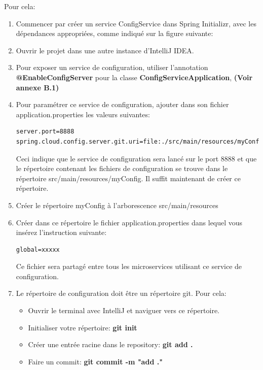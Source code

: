     Pour cela:      
    \begin{enumerate}
    	
    	\item  Commencer par créer un service ConfigService dans Spring Initializr, avec les dépendances appropriées, comme indiqué sur la figure suivante:
    	
    	
    	
    	\item  Ouvrir le projet dans une autre instance d'IntelliJ IDEA.
    	
    	\item  Pour exposer un service de configuration, utiliser l'annotation\\
    	\textbf{@EnableConfigServer} pour la classe \textbf{ConfigServiceApplication}, \textbf{(Voir annexe B.1)}  
    	\item  Pour paramétrer ce service de configuration, ajouter dans son fichier application.properties les valeurs suivantes:
    	
\begin{lstlisting}
server.port=8888
spring.cloud.config.server.git.uri=file:./src/main/resources/myConfig
\end{lstlisting}
    	
    	Ceci indique que le service de configuration sera lancé sur le port 8888 et que le répertoire contenant les fichiers de configuration se trouve dans le répertoire src/main/resources/myConfig. Il suffit maintenant de créer ce répertoire.
    	
    	
    	\item  Créer le répertoire myConfig à l'arborescence src/main/resources
    	
    	\item  Créer dans ce répertoire le fichier application.properties dans lequel vous insérez l'instruction suivante:
    	\begin{lstlisting}
global=xxxxx
    	\end{lstlisting}
    	
    	Ce fichier sera partagé entre tous les microservices utilisant ce service de configuration.
    	
    	\item Le répertoire de configuration doit être un répertoire git. Pour cela:
    	
    	\begin{itemize}
    		\item Ouvrir le terminal avec IntelliJ et naviguer vers ce répertoire.
    		\item  Initialiser votre répertoire:\textbf{ git init}
    		\item  Créer une entrée racine dans le repository: \textbf{git add .}
    		\item  Faire un commit: \textbf{git commit -m "add ."}
    	\end{itemize}
    	

\end{enumerate}
